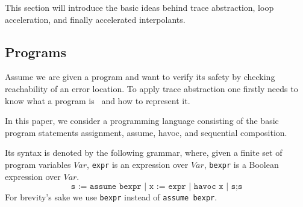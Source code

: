 \documentclass{article}
\newcommand{\Var}{\ensuremath{\mathit{Var}}\xspace}
\newcommand\mycom[1]{}
\newcommand\mycom[1]{#1}
\newcommand{\dd}[1]{\mycom{\todo[color=orange!40,inline]{\small DD: #1}}}
\begin{document}
This section will introduce the basic ideas behind trace abstraction, loop acceleration, and finally accelerated interpolants.

\subsection{Programs}
Assume we are given a program and want to verify its safety by checking reachability of an error location.
To apply trace abstraction one firstly needs to know what a program is~\cite{DBLP:journals/corr/GreitschusDP17} and how to represent it.

In this paper, we consider a programming language consisting of the basic program statements assignment, assume, havoc, and sequential composition.
\dd{What about havoc?}
Its syntax is denoted by the following grammar, where, given a finite set of program variables \Var, \texttt{expr} is an expression over \Var, \texttt{bexpr} is a Boolean expression over \Var.
\begin{equation*}
	\texttt{s := assume bexpr | x := expr | havoc x | s;s}
\end{equation*}
For brevity's sake we use \texttt{bexpr} instead of \texttt{assume bexpr}.
\end{document}
